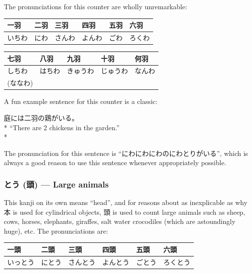 \documentclass[11pt, b5paper, twoside, openright, onecolumn]{book}
\makeatletter
\newcommand*{\rubystack}[2]{{\relscale{0.5}%
  \begin{tabular}[b]{@{}c@{}}%
    {#1}\\%
   {\textscale{2}{#2}}%
  \end{tabular}}%
}
\DeclareRobustCommand*{\ruby}[2]{%
  \mbox{%
    \setlength{\parskip}{0ex}%
    \BeginAccSupp{method=pdfstringdef,ActualText={#1}}%
      \rubystack{\phantom{#2}}{#1}%
      \llap{%
        \rubystack{#2}{\phantom{#1}}%
      }%
    \EndAccSupp{}%
  }%
}
\renewcommand*{\ruby}[2]{#2 (#1)}%
\newenvironment{exampleblock}{
\setlength{\parindent}{0.6in}
\begin{minipage}[t]{\dimexpr\textwidth-\parindent}}
{\end{minipage}}
\newenvironment{mytabular}[1]{\noindent\hspace{0.4in}
\begin{tabular}[h]{#1}}{\end{tabular}}
\makeatother
\begin{document}
The pronunciations for this counter are wholly unremarkable:

\vspace{0.5cm}
\smaller
\begin{mytabular}{| l  l  l  l  l  l |}\hline 
\rule{0pt}{2.4ex}一羽 & 二羽 & 三羽 & 四羽 & 五羽 & 六羽\\ 
\hline
\rule{0pt}{2.4ex}いちわ & にわ & さんわ & よんわ & ごわ & ろくわ\\ 
\hline 
\end{mytabular}
\larger
\vspace{0.5cm}

\smaller
\begin{mytabular}{| l  l  l  l  l |}\hline 
\rule{0pt}{2.4ex}七羽 & 八羽 & 九羽 & 十羽 & 何羽\\ 
\hline
\rule{0pt}{2.4ex}しちわ & はちわ & きゅうわ & じゅうわ & なんわ\\ 
\rule{0pt}{2.4ex}(ななわ) &  &  &  & \\ 
\hline 
\end{mytabular}
\larger
\vspace{0.5cm}


A fun example sentence for this counter is a classic:

\vspace{0.4cm}
\begin{exampleblock}
庭には二羽の鶏がいる。 \\* 
“There are 2 chickens in the garden.” \\* 
\end{exampleblock}
\vspace{0.2cm}

The pronunciation for this sentence is “にわにわにわのにわとりがいる”‚ which is always a good reason to use this sentence whenever appropriately possible.

\subsubsection{\ruby{頭}{とう} — Large animals}

This kanji on its own means “head”‚ and for reasons about as inexplicable as why 本 is used for cylindrical objects‚ 頭 is used to count large animals such as sheep‚ cows‚ horses‚ elephants‚ giraffes‚ salt water crocodiles (which are astoundingly huge)‚ etc. The pronunciations are:

\vspace{0.5cm}
\smaller
\begin{mytabular}{| l  l  l  l  l  l |}\hline 
\rule{0pt}{2.4ex}一頭 & 二頭 & 三頭 & 四頭 & 五頭 & 六頭\\ 
\hline
\rule{0pt}{2.4ex}いっとう & にとう & さんとう & よんとう & ごとう & ろくとう\\ 
\hline 
\end{mytabular}
\larger
\vspace{0.5cm}
\end{document}
